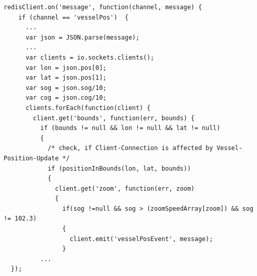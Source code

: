 \begin{lstlisting}[caption= Weiterleitung von Positions-Updates an Websocket-Clients in worker.js, label= Weiterleitung von Positions-Updates an Websocket-Clients in worker.js]
 redisClient.on('message', function(channel, message) {
    if (channel == 'vesselPos')  {
      ...
      var json = JSON.parse(message);
      ...
      var clients = io.sockets.clients();
      var lon = json.pos[0];
      var lat = json.pos[1];
      var sog = json.sog/10;
      var cog = json.cog/10;
      clients.forEach(function(client) {
        client.get('bounds', function(err, bounds) {
          if (bounds != null && lon != null && lat != null) 
          {
            /* check, if Client-Connection is affected by Vessel-Position-Update */
            if (positionInBounds(lon, lat, bounds)) 
            {
              client.get('zoom', function(err, zoom) 
              {
                if(sog !=null && sog > (zoomSpeedArray[zoom]) && sog != 102.3)
                {
                  client.emit('vesselPosEvent', message);
                }
          ...
  });
\end{lstlisting}

\newpage
